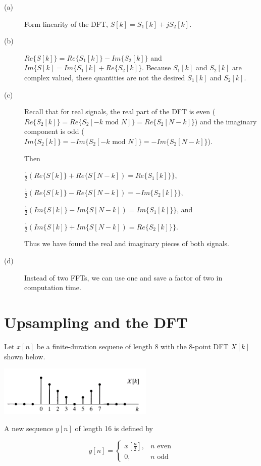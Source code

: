 \documentclass[11pt]{article}
\begin{document}
{ \color{blue}
\begin{description}
\item[(a)] Form linearity of the DFT, $S[k] = S_1[k]+jS_2[k]$.
\item[(b)] $Re\{S[k]\} = Re\{S_1[k]\} - Im\{S_2[k]\}$ and $Im\{S[k] = Im\{S_1[k]+Re\{S_2[k]\}$. Because $S_1[k]$ and $S_2[k]$ are complex valued, these quantities are not the desired $S_1[k]$ and $S_2[k]$.
\item[(c)] Recall that for real signals, the real part of the DFT is even  ($Re\{S_2[k]\} = Re\{S_2[-k\text{ mod } N]\} = Re\{S_2[N-k]\}$) and the imaginary component is odd ($Im\{S_2[k]\} = -Im\{S_2[-k \text{ mod }N]\} = -Im\{S_2[N-k]\}$). 

Then 

$\frac{1}{2}\left(Re\{S[k]\}+ Re\{S[N-k]\right) = Re\{S_1[k]\}\}$, 

$\frac{1}{2}\left(Re\{S[k]\}- Re\{S[N-k]\right) = -Im\{S_2[k]\}\}$, 

$\frac{1}{2}\left(Im\{S[k]\}- Im\{S[N-k]\right) = Im\{S_1[k]\}\}$, and

 $\frac{1}{2}\left(Im\{S[k]\}+ Im\{S[N-k]\right) = Re\{S_2[k]\}\}$.

Thus we have found the real and imaginary pieces of both signals.
\item[(d)] Instead of two FFTs, we can use one and save a factor of two in computation time.
\end{description}
}

\section{Upsampling and the DFT}
Let $x[n]$ be a finite-duration sequene of length 8 with the 8-point DFT $X[k]$ shown below.

\includegraphics[scale=1]{p8-32-a.png} 

A new sequence $y[n]$ of length 16 is defined by 

\[y[n] = \begin{cases} x\left[ \frac{n}{2}\right], & n \text{ even}\\
0, & n \text{ odd} \end{cases} \]
\end{document}
